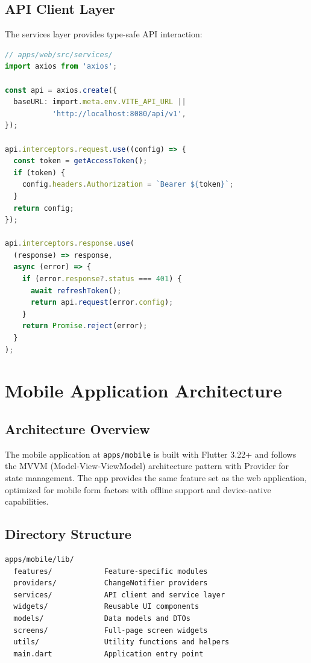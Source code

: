 \documentclass[11pt,a4paper]{article}
\begin{document}
\subsection{API Client Layer}

The services layer provides type-safe API interaction:

\begin{lstlisting}[language=TypeScript, caption=API Client Structure]
// apps/web/src/services/
import axios from 'axios';

const api = axios.create({
  baseURL: import.meta.env.VITE_API_URL ||
           'http://localhost:8080/api/v1',
});

api.interceptors.request.use((config) => {
  const token = getAccessToken();
  if (token) {
    config.headers.Authorization = `Bearer ${token}`;
  }
  return config;
});

api.interceptors.response.use(
  (response) => response,
  async (error) => {
    if (error.response?.status === 401) {
      await refreshToken();
      return api.request(error.config);
    }
    return Promise.reject(error);
  }
);
\end{lstlisting}

\clearpage

\section{Mobile Application Architecture}

\subsection{Architecture Overview}

The mobile application at \texttt{apps/mobile} is built with Flutter 3.22+ and follows the MVVM (Model-View-ViewModel) architecture pattern with Provider for state management. The app provides the same feature set as the web application, optimized for mobile form factors with offline support and device-native capabilities.

\subsection{Directory Structure}

\begin{verbatim}
apps/mobile/lib/
  features/            Feature-specific modules
  providers/           ChangeNotifier providers
  services/            API client and service layer
  widgets/             Reusable UI components
  models/              Data models and DTOs
  screens/             Full-page screen widgets
  utils/               Utility functions and helpers
  main.dart            Application entry point
\end{verbatim}
\end{document}
